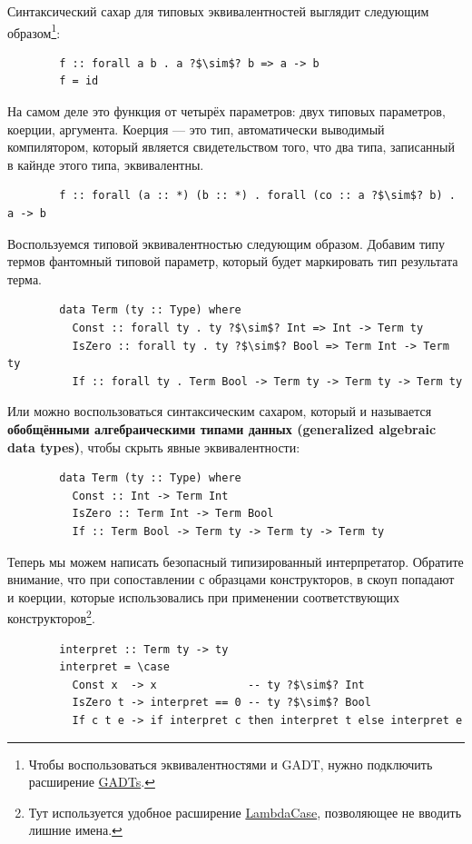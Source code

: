 \documentclass[12pt]{article}
\newcommand{\vocab}[1]{\textbf{#1}} %
\begin{document}
    Синтаксический сахар для типовых эквивалентностей выглядит следующим образом\footnote{Чтобы воспользоваться эквивалентностями и GADT, нужно подключить расширение \href{https://downloads.haskell.org/~ghc/9.0.1/docs/html/users_guide/exts/gadt.html}{GADTs}.}:
    \begin{verbatim}
        f :: forall a b . a ?$\sim$? b => a -> b
        f = id
    \end{verbatim}
    На самом деле это функция от четырёх параметров: двух типовых параметров, коерции, аргумента.
    Коерция --- это тип, автоматически выводимый компилятором, который является свидетельством того, что два типа, записанный в кайнде этого типа, эквивалентны.
    \begin{verbatim}
        f :: forall (a :: *) (b :: *) . forall (co :: a ?$\sim$? b) . a -> b
    \end{verbatim}

    Воспользуемся типовой эквивалентностью следующим образом.
    Добавим типу термов фантомный типовой параметр, который будет маркировать тип результата терма.
    \begin{verbatim}
        data Term (ty :: Type) where
          Const :: forall ty . ty ?$\sim$? Int => Int -> Term ty
          IsZero :: forall ty . ty ?$\sim$? Bool => Term Int -> Term ty
          If :: forall ty . Term Bool -> Term ty -> Term ty -> Term ty
    \end{verbatim}
    Или можно воспользоваться синтаксическим сахаром, который и называется \vocab{обобщёнными алгебраическими типами данных (generalized algebraic data types)}, чтобы скрыть явные эквивалентности:
    \begin{verbatim}
        data Term (ty :: Type) where
          Const :: Int -> Term Int
          IsZero :: Term Int -> Term Bool
          If :: Term Bool -> Term ty -> Term ty -> Term ty
    \end{verbatim}

    Теперь мы можем написать безопасный типизированный интерпретатор.
    Обратите внимание, что при сопоставлении с образцами конструкторов, в скоуп попадают и коерции, которые использовались при применении соответствующих конструкторов\footnote{Тут используется удобное расширение \href{https://downloads.haskell.org/~ghc/9.0.1/docs/html/users_guide/exts/lambda_case.html}{LambdaCase}, позволяющее не вводить лишние имена.}.
    \begin{verbatim}
        interpret :: Term ty -> ty
        interpret = \case
          Const x  -> x              -- ty ?$\sim$? Int
          IsZero t -> interpret == 0 -- ty ?$\sim$? Bool
          If c t e -> if interpret c then interpret t else interpret e
    \end{verbatim}
\end{document}
